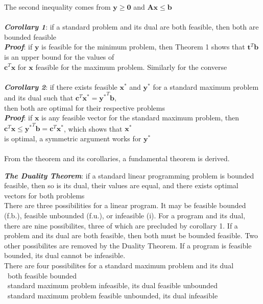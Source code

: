 \documentclass[10pt,letterpaper]{scrartcl}
\newcommand{\boph}[1]{\emph{\textbf{#1}}} %
\newcommand{\tbul}{\textbullet}
\begin{document}
\begin{tabbing}
\begin{tabbing}
The second inequality comes from $\mathbf{y}\geq\mathbf{0}$ and $\mathbf{Ax}\leq\mathbf{b}$ \\ \\
\boph{Corollary 1}: if a standard problem and its dual are both feasible, then both are bounded feasible \\
\boph{Proof}: if $\mathbf{y}$ is feasible for the minimum problem, then Theorem 1 shows that $\mathbf{t}^T\mathbf{b}$ is an upper bound for the values of \\ $\mathbf{c}^T\mathbf{x}$ for $\mathbf{x}$ feasible for the maximum problem. Similarly for the converse \\ \\
\boph{Corollary 2}: if there exists feasible $\mathbf{x^{*}}$ and $\mathbf{y^{*}}$ for a standard maximum problem and its dual such that $\mathbf{c}^T\mathbf{x^{*}}=\mathbf{y^{*}}^T\mathbf{b}$, \\ then both are optimal for their respective problems \\
\boph{Proof}: if $\mathbf{x}$ is any feasible vector for the standard maximum problem, then $\mathbf{c}^T\mathbf{x}\leq\mathbf{y^{*}}^T\mathbf{b}=\mathbf{c}^T\mathbf{x^{*}}$, which shows that $\mathbf{x^{*}}$ \\ is optimal, a symmetric argument works for $\mathbf{y^{*}}$\\ \\
From the theorem and its corollaries, a fundamental theorem is derived.\end{tabbing}
\boph{The Duality Theorem}: if a standard linear programming problem is bounded feasible, then so is its dual, their values are equal, and there exists optimal vectors for both problems \\
There are three possibilities for a linear program. It may be feasible bounded (f.b.), feasible unbounded (f.u.), or infeasible (i). For a program and its dual, there are nine possibilites, three of which are precluded by corollary 1. If a problem and its dual are both feasible, then both must be bounded feasible. Two other possibilites are removed by the Duality Theorem. If a program is feasible bounded, its dual cannot be infeasible. \\
There are four possibilites for a standard maximum problem and its dual \\
\tbul\ both feasible bounded \\
\tbul\ standard maximum problem infeasible, its dual feasible unbounded \\
\tbul\ standard maximum problem feasible unbounded, its dual infeasible \\

\end{tabbing}
\end{document}
